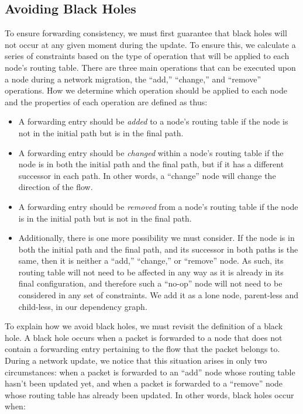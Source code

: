 \documentclass[pageno]{jpaper}
\begin{document}
\subsection{Avoiding Black Holes}
\label{subsec:blackholes}
To ensure forwarding consistency, we must first guarantee that black holes will not occur at any given moment during the update. To ensure this, we calculate a series of constraints based on the type of operation that will be applied to each node's routing table. There are three main operations that can be executed upon a node during a network migration, the ``add,'' ``change,'' and ``remove'' operations. How we determine which operation should be applied to each node and the properties of each operation are defined as thus:\\

\begin{itemize}
\item A forwarding entry should be \textit{added} to a node's routing table if the node is not in the initial path but is in the final path.
\item A forwarding entry should be \textit{changed} within a node's routing table if the node is in both the initial path and the final path, but if it has a different successor in each path. In other words, a ``change'' node will change the direction of the flow.
\item A forwarding entry should be \textit{removed} from a node's routing table if the node is in the initial path but is not in the final path.
\item Additionally, there is one more possibility we must consider. If the node is in both the initial path and the final path, and its successor in both paths is the same, then it is neither a ``add,'' ``change,'' or ``remove'' node. As such, its routing table will not need to be affected in any way as it is already in its final configuration, and therefore such a ``no-op'' node will not need to be considered in any set of constraints. We add it as a lone node, parent-less and child-less, in our dependency graph.\\
\end{itemize}

To explain how we avoid black holes, we must revisit the definition of a black hole. A black hole occurs when a packet is forwarded to a node that does not contain a forwarding entry pertaining to the flow that the packet belongs to. During a network update, we notice that this situation arises in only two circumstances: when a packet is forwarded to an ``add'' node whose routing table hasn't been updated yet, and when a packet is forwarded to a ``remove'' node whose routing table has already been updated. In other words, black holes occur when:\\
\end{document}

